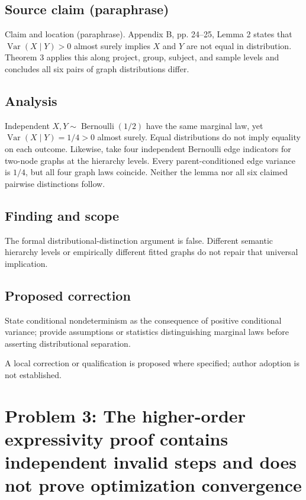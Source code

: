 \documentclass[11pt]{article}
\begin{document}
\subsection*{Source claim (paraphrase)}

Claim and location (paraphrase). Appendix B, pp. 24–25, Lemma 2 states that \(\operatorname{Var}(X\mid Y)>0\) almost surely implies \(X\) and \(Y\) are not equal in distribution. Theorem 3 applies this along project, group, subject, and sample levels and concludes all six pairs of graph distributions differ.

\subsection*{Analysis}

Independent \(X,Y\sim\operatorname{Bernoulli}(1/2)\) have the same marginal law, yet \(\operatorname{Var}(X\mid Y)=1/4>0\) almost surely. Equal distributions do not imply equality on each outcome. Likewise, take four independent Bernoulli edge indicators for two-node graphs at the hierarchy levels. Every parent-conditioned edge variance is \(1/4\), but all four graph laws coincide. Neither the lemma nor all six claimed pairwise distinctions follow.

\subsection*{Finding and scope}

The formal distributional-distinction argument is false. Different semantic hierarchy levels or empirically different fitted graphs do not repair that universal implication.

\subsection*{Proposed correction}

State conditional nondeterminism as the consequence of positive conditional variance; provide assumptions or statistics distinguishing marginal laws before asserting distributional separation.

A local correction or qualification is proposed where specified; author adoption is not established.

\section*{Problem 3: The higher-order expressivity proof contains independent invalid steps and does not prove optimization convergence}
\end{document}
